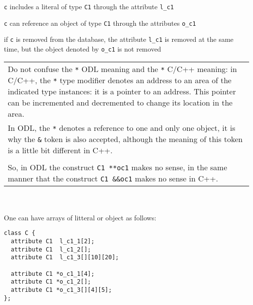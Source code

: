 \bi
\item \texttt{c} includes a literal of type \texttt{C1} through the attribute
\texttt{l\_c1}
\item \texttt{c} can reference an object of type \texttt{C1} through the attributes 
\texttt{o\_c1}
\item if \texttt{c} is removed from the database, the attribute \texttt{l\_c1}
is removed at the same time, but the object denoted by \texttt{o\_c1} is
not removed
\ei
\begin{tabular}{|p{16.8cm}|}
\hline
\vspace{0.1mm}
Do not confuse the \texttt{*} ODL meaning and the \texttt{*} C/C++ meaning:
in C/C++, the \texttt{*} type modifier denotes an address to an area of the
indicated type instances: it is a pointer to an address. This pointer
can be incremented and decremented to change its location in the area.
\\
In ODL, the \texttt{*} denotes a reference to one and only one object, it is why
the \texttt{\&} token is also accepted, although the meaning of this token
is a little bit different in C++.
\\
\\
So, in ODL the construct \texttt{C1 **oc1} makes no sense, in the same
manner that the construct \texttt{C1 \&\&oc1} makes no sense in C++.\\
\hline
\end{tabular}\\
\\
One can have arrays of litteral or object as follows:
\vspace{-0.2cm}
\begin{verbatim}
class C {
  attribute C1  l_c1_1[2];
  attribute C1  l_c1_2[];
  attribute C1  l_c1_3[][10][20];

  attribute C1 *o_c1_1[4];
  attribute C1 *o_c1_2[];
  attribute C1 *o_c1_3[][4][5];
};
\end{verbatim}

